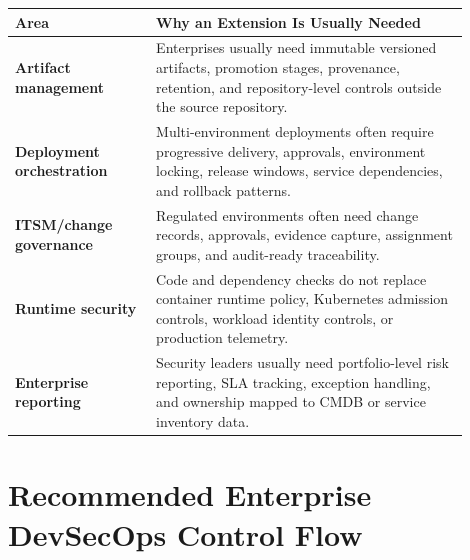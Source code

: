 \documentclass[11pt]{article}
\providecommand{\term}[1]{\textbf{#1}}
\begin{document}
\begin{longtable}{>{\raggedright\arraybackslash}p{0.28\linewidth} >{\raggedright\arraybackslash}p{0.62\linewidth}}
\toprule
\textbf{Area} & \textbf{Why an Extension Is Usually Needed} \\
\midrule
\endhead
\term{Artifact management} & Enterprises usually need immutable versioned artifacts, promotion stages, provenance, retention, and repository-level controls outside the source repository. \\
\midrule
\term{Deployment orchestration} & Multi-environment deployments often require progressive delivery, approvals, environment locking, release windows, service dependencies, and rollback patterns. \\
\midrule
\term{ITSM/change governance} & Regulated environments often need change records, approvals, evidence capture, assignment groups, and audit-ready traceability. \\
\midrule
\term{Runtime security} & Code and dependency checks do not replace container runtime policy, Kubernetes admission controls, workload identity controls, or production telemetry. \\
\midrule
\term{Enterprise reporting} & Security leaders usually need portfolio-level risk reporting, SLA tracking, exception handling, and ownership mapped to CMDB or service inventory data. \\
\bottomrule
\end{longtable}

\section{Recommended Enterprise DevSecOps Control Flow}
\end{document}
